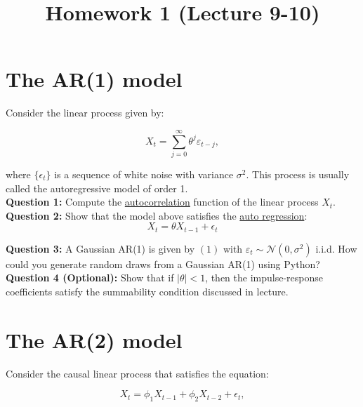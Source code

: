 \documentclass[12] {article}
\begin{document}
\onehalfspace

\title{Homework 1 (Lecture 9-10)}
\date{}
\maketitle

\section{The AR(1) model}

Consider the linear process given by:

\begin{equation}
X_t = \sum_{j=0}^{\infty} \theta^j \varepsilon_{t-j}, 
\end{equation}

\noindent where $\{\epsilon_{t}\}$ is a sequence of white noise with variance $\sigma^2$. This process is usually called the autoregressive model of order 1. \\ 

\noindent \textbf{Question 1:} Compute the \underline{autocorrelation} function of the linear process $X_t$. \\

\noindent \textbf{Question 2:} Show that the model above satisfies the \underline{auto regression}:
\begin{equation}
X_t = \theta X_{t-1} + \epsilon_{t}
\end{equation}
 
\noindent \textbf{Question 3:}  A Gaussian AR(1) is given by $(1)$ with $\varepsilon_{t} \sim \mathcal{N}(0,\sigma^2)$ i.i.d.  How could you generate random draws from a Gaussian AR(1) using Python? \\

\noindent \textbf{Question 4 (Optional):} Show that if $|\theta| < 1$, then the impulse-response coefficients satisfy the summability condition discussed in lecture. \\

\section{The AR(2) model}

Consider the causal linear process that satisfies the equation:

\begin{equation}
X_t = \phi_1 X_{t-1} + \phi_2 X_{t-2} + \epsilon_{t}, 
\end{equation}
\end{document}
